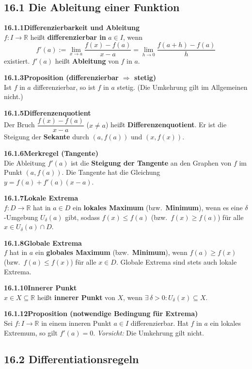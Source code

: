 \documentclass[a4paper,12pt]{article}
\newcommand{\gentry}[3]{%
  \noindent\textbf{#1\quad #2}\nopagebreak\\[0.2em]
  #3\par\smallskip
}
\begin{document}
\subsection*{16.1 \quad Die Ableitung einer Funktion}

\gentry{16.1.1}{Differenzierbarkeit und Ableitung}{%
  $f: I \to \mathbb{R}$ heißt \textbf{differenzierbar in} $a \in I$, wenn
  \[
    f'(a) := \lim_{x \to a} \frac{f(x) - f(a)}{x - a}
    = \lim_{h \to 0} \frac{f(a+h) - f(a)}{h}
  \]
  existiert. $f'(a)$ heißt \textbf{Ableitung} von $f$ in $a$.
}

\gentry{16.1.3}{Proposition (differenzierbar $\Rightarrow$ stetig)}{%
  Ist $f$ in $a$ differenzierbar, so ist $f$ in $a$ stetig.
  (Die Umkehrung gilt im Allgemeinen nicht.)
}

\gentry{16.1.5}{Differenzenquotient}{%
  Der Bruch $\dfrac{f(x) - f(a)}{x - a}$ ($x \neq a$) heißt \textbf{Differenzenquotient}.
  Er ist die Steigung der \textbf{Sekante} durch $(a, f(a))$ und $(x, f(x))$.
}

\gentry{16.1.6}{Merkregel (Tangente)}{%
  Die Ableitung $f'(a)$ ist die \textbf{Steigung der Tangente} an den Graphen von
  $f$ im Punkt $(a, f(a))$. Die Tangente hat die Gleichung $y = f(a) + f'(a)(x-a)$.
}

\gentry{16.1.7}{Lokale Extrema}{%
  $f: D \to \mathbb{R}$ hat in $a \in D$ ein \textbf{lokales Maximum} (bzw.\
  \textbf{Minimum}), wenn es eine $\delta$-Umgebung $U_\delta(a)$ gibt, sodass
  $f(x) \le f(a)$ (bzw.\ $f(x) \ge f(a)$) für alle $x \in U_\delta(a) \cap D$.
}

\gentry{16.1.8}{Globale Extrema}{%
  $f$ hat in $a$ ein \textbf{globales Maximum} (bzw.\ \textbf{Minimum}),
  wenn $f(a) \ge f(x)$ (bzw.\ $f(a) \le f(x)$) für alle $x \in D$.
  Globale Extrema sind stets auch lokale Extrema.
}

\gentry{16.1.10}{Innerer Punkt}{%
  $x \in X \subseteq \mathbb{R}$ heißt \textbf{innerer Punkt} von $X$, wenn
  $\exists\, \delta > 0: U_\delta(x) \subseteq X$.
}

\gentry{16.1.12}{Proposition (notwendige Bedingung für Extrema)}{%
  Sei $f: I \to \mathbb{R}$ in einem inneren Punkt $a \in I$ differenzierbar.
  Hat $f$ in $a$ ein lokales Extremum, so gilt $f'(a) = 0$.
  \textit{Vorsicht:} Die Umkehrung gilt nicht.
}

\subsection*{16.2 \quad Differentiationsregeln}
\end{document}
